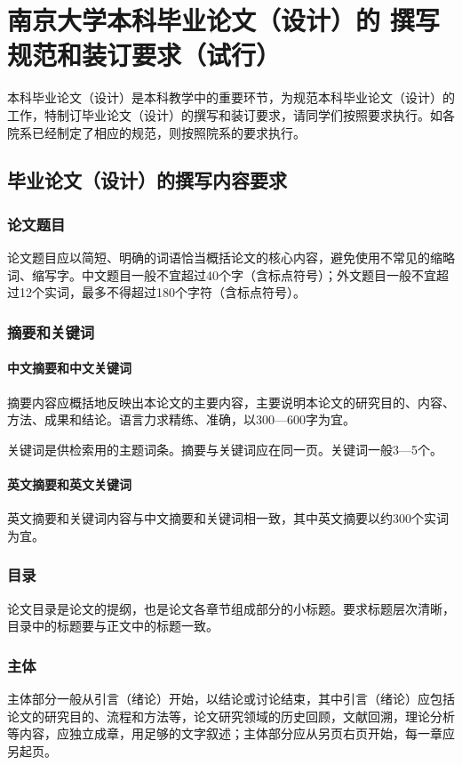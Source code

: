 \chapter{南京大学本科毕业论文（设计）的
撰写规范和装订要求（试行）}

本科毕业论文（设计）是本科教学中的重要环节，为规范本科毕业论文（设计）的工作，特制订毕业论文（设计）的撰写和装订要求，请同学们按照要求执行。如各院系已经制定了相应的规范，则按照院系的要求执行。

\section{毕业论文（设计）的撰写内容要求}
\subsection{论文题目}
论文题目应以简短、明确的词语恰当概括论文的核心内容，避免使用不常见的缩略词、缩写字。中文题目一般不宜超过40个字（含标点符号）；外文题目一般不宜超过12个实词，最多不得超过180个字符（含标点符号）。
\subsection{摘要和关键词}
\subsubsection{中文摘要和中文关键词}
摘要内容应概括地反映出本论文的主要内容，主要说明本论文的研究目的、内容、方法、成果和结论。语言力求精练、准确，以300—600字为宜。

关键词是供检索用的主题词条。摘要与关键词应在同一页。关键词一般3—5个。

\subsubsection{英文摘要和英文关键词}
英文摘要和关键词内容与中文摘要和关键词相一致，其中英文摘要以约300个实词为宜。

\subsection{目录}
论文目录是论文的提纲，也是论文各章节组成部分的小标题。要求标题层次清晰，目录中的标题要与正文中的标题一致。

\subsection{主体}
主体部分一般从引言（绪论）开始，以结论或讨论结束，其中引言（绪论）应包括论文的研究目的、流程和方法等，论文研究领域的历史回顾，文献回溯，理论分析等内容，应独立成章，用足够的文字叙述；主体部分应从另页右页开始，每一章应另起页。

